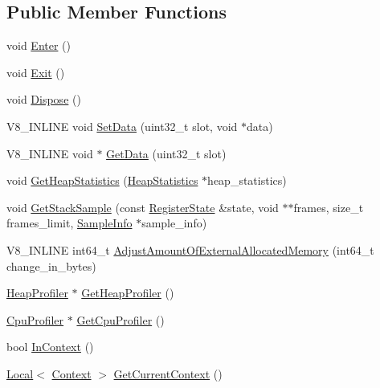 \subsection*{Public Member Functions}
\begin{DoxyCompactItemize}
\item 
void \hyperlink{classv8_1_1_isolate_aec80bb49b6b7647ff75e8f2cc9484ea3}{Enter} ()
\item 
void \hyperlink{classv8_1_1_isolate_a64a8503cafd00d1d2cadfbb0c2345054}{Exit} ()
\item 
void \hyperlink{classv8_1_1_isolate_a1a5a5762e4221aff8c6b10f9e3cec0af}{Dispose} ()
\item 
V8\+\_\+\+I\+N\+L\+I\+N\+E void \hyperlink{classv8_1_1_isolate_a2ae968a7ff8a397f1ac09d32990883f6}{Set\+Data} (uint32\+\_\+t slot, void $\ast$data)
\item 
V8\+\_\+\+I\+N\+L\+I\+N\+E void $\ast$ \hyperlink{classv8_1_1_isolate_aed85b3c82bf69a60ecebc2558ab95083}{Get\+Data} (uint32\+\_\+t slot)
\item 
void \hyperlink{classv8_1_1_isolate_add32e78544edaf8946ed9b328167e5e4}{Get\+Heap\+Statistics} (\hyperlink{classv8_1_1_heap_statistics}{Heap\+Statistics} $\ast$heap\+\_\+statistics)
\item 
void \hyperlink{classv8_1_1_isolate_a8b173b48a477267ccd6c7d17c492b82e}{Get\+Stack\+Sample} (const \hyperlink{structv8_1_1_register_state}{Register\+State} \&state, void $\ast$$\ast$frames, size\+\_\+t frames\+\_\+limit, \hyperlink{structv8_1_1_sample_info}{Sample\+Info} $\ast$sample\+\_\+info)
\item 
V8\+\_\+\+I\+N\+L\+I\+N\+E int64\+\_\+t \hyperlink{classv8_1_1_isolate_aaeda5fa60961a3d9d476c46200e30711}{Adjust\+Amount\+Of\+External\+Allocated\+Memory} (int64\+\_\+t change\+\_\+in\+\_\+bytes)
\item 
\hyperlink{classv8_1_1_heap_profiler}{Heap\+Profiler} $\ast$ \hyperlink{classv8_1_1_isolate_a9c48259615e8370f6f0efd27cd7f99a6}{Get\+Heap\+Profiler} ()
\item 
\hyperlink{classv8_1_1_cpu_profiler}{Cpu\+Profiler} $\ast$ \hyperlink{classv8_1_1_isolate_a7eb415d9210d912aa57877ab6416fec8}{Get\+Cpu\+Profiler} ()
\item 
bool \hyperlink{classv8_1_1_isolate_afb6bbd31a87d0999dbbe5402447690a9}{In\+Context} ()
\item 
\hyperlink{classv8_1_1_local}{Local}$<$ \hyperlink{classv8_1_1_context}{Context} $>$ \hyperlink{classv8_1_1_isolate_afa1b6cde5a7a7cfde87eaabc4ab34062}{Get\+Current\+Context} ()
\item 
$$
\end{DoxyCompactItemize}
